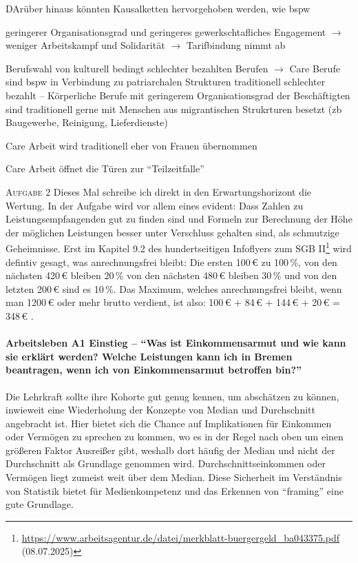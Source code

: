 DArüber hinaus könnten Kausalketten hervorgehoben werden, wie \gls{bspw}
\begin{myitemize}
    \item geringerer Organisationsgrad und geringeres gewerkschtafliches Engagement $\rightarrow$ weniger Arbeitskampf und Solidarität $\rightarrow$ Tarifbindung nimmt ab
    \item Berufswahl von kulturell bedingt schlechter bezahlten Berufen $\rightarrow$ Care Berufe sind \gls{bspw} in Verbindung zu patriarchalen Strukturen traditionell schlechter bezahlt -- Körperliche Berufe mit geringerem Organisationsgrad der Beschäftigten sind traditionell gerne mit Menschen aus migrantischen Strukrturen besetzt (\gls{zb} Baugewerbe, Reinigung, Lieferdienste)
    \item Care Arbeit wird traditionell eher von Frauen übernommen
    \item Care Arbeit öffnet die Türen zur \enquote{Teilzeitfalle}
\end{myitemize}




\textsc{Aufgabe 2} \quad
Dieses Mal schreibe ich direkt in den Erwartungshorizont die Wertung. 
In der Aufgabe wird vor allem eines evident: Dass Zahlen zu Leistungsempfangenden gut zu finden sind und Formeln zur Berechnung der Höhe der möglichen Leistungen besser unter Verschluss gehalten sind, als schmutzige Geheimnisse. 
Erst im Kapitel 9.2 des hundertseitigen Infoflyers zum SGB II\footnote{
    \url{https://www.arbeitsagentur.de/datei/merkblatt-buergergeld_ba043375.pdf} (08.07.2025)
} wird defintiv gesagt, was anrechnungsfrei bleibt: Die ersten 100\,€ zu 100\,\%, von den nächsten 420\,€ bleiben 20\,\% von den nächsten 480\,€ bleiben 30\,\% und von den letzten 200\,€ sind es 10\,\%. Das Maximum, welches anrechnungsfrei bleibt, wenn man 1200\,€ oder mehr brutto verdient, ist also: 100\,€ + 84\,€ + 144\,€ + 20\,€ = 348\,€ \autocite[59-62]{MerkblattSGBII}. 




\paragraph{Arbeitsleben A1 Einstieg -- \enquote{Was ist Einkommensarmut und wie kann sie erklärt werden? Welche Leistungen kann ich in Bremen beantragen, wenn ich von Einkommensarmut betroffen bin?}}
Die Lehrkraft sollte ihre Kohorte gut genug kennen, um abschätzen zu können, inwieweit eine Wiederholung der Konzepte von Median und Durchschnitt angebracht ist. Hier bietet sich die Chance auf Implikationen für Einkommen oder Vermögen zu sprechen zu kommen, wo es in der Regel nach oben um einen größeren Faktor Ausreißer gibt, weshalb dort häufig der Median und nicht der Durchschnitt als Grundlage genommen wird. Durchschnittseinkommen oder Vermögen liegt zumeist weit über dem Median. Diese Sicherheit im Verständnis von Statistik bietet für Medienkompetenz und das Erkennen von \enquote{framing} eine gute Grundlage.

